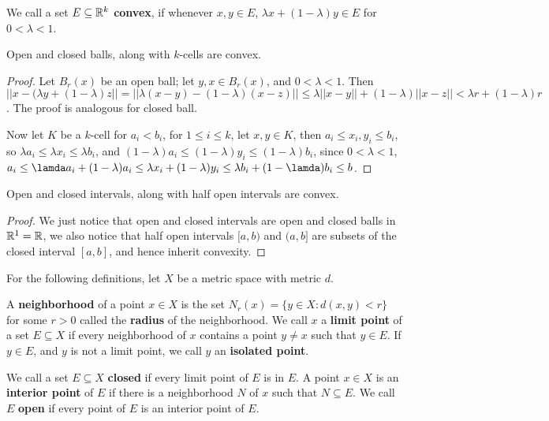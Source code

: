 \begin{definition}
    We call a set $E \subseteq \mathbb{R}^k$ \textbf{convex}, if whenever  $x,y \in E$,
    $\lambda x+(1-\lambda)y \in E$ for  $0 <\lambda<1$.
\end{definition}

\begin{lemma}\label{2.2.1}
    Open and closed balls, along with $k$-cells are convex.
\end{lemma}
\begin{proof}
    Let $B_r(x)$ be an open ball; let $y,x \in B_r(x)$, and  $0<\lambda<1$. Then
    $||x-(\lambda y+(1-\lambda)z||=||\lambda(x-y)-(1-\lambda)(x-z)|| \leq \lambda||x-y||+(1-\lambda)||x-z||<\lambda r+(1-\lambda)r$.
    The proof is analogous for  closed ball.

    Now let  $K$ be a  $k$-cell for  $a_i<b_i$, for  $1 \leq i \leq k$, let  $x,y \in K$,
    then $a_i \leq x_i,y_i \leq b_i$, so  $\lambda a_i \leq \lambda x_i \leq \lambda b_i$, and $(1-\lambda)a_i \leq (1-\lambda)y_i
    \leq (1-\lambda)b_i$, since  $0<\lambda<1$, $a_i \leq \lamda a_i+(1-\lambda)a_i \leq \lambda x_i+(1-\lambda)y_i \leq \lambda
    b_i+(1-\lamda)b_i \leq b$.
\end{proof}

\begin{corollary}
    Open and closed intervals, along with half open intervals are convex.
\end{corollary}
\begin{proof}
    We just notice that open and closed intervals are open and closed balls in $\mathbb{R}^1=\mathbb{R}$,
    we also notice that half open intervals $[a,b)$ and  $(a,b]$ are subsets of the closed interval
    $[a,b]$, and hence inherit convexity.
\end{proof}

For the following definitions, let $X$ be a metric space with metric $d$.

\begin{definition}
    A  \textbf{neighborhood} of a point $x \in X$ is the set
    $N_r(x)=\{y \in X: d(x,y)<r\}$ for some $r>0$ called the \textbf{radius} of the neighborhood.
    We call  $x$ a \textbf{limit point} of a set  $E \subseteq X$ if every neighborhood of  $x$
    contains a point  $y \neq x$ such that  $y \in E$. If  $y \in E$, and $y$ is not
    a limit point, we call  $y$ an \textbf{isolated point}.
\end{definition}

\begin{definition}
    We call a set $E \subseteq X$ \textbf{closed} if every limit point of $E$ is in $E$. A point
    $x \in X$ is an \textbf{interior point} of $E$ if there is a neighborhood $N$ of  $x$ such that
    $N \subseteq E$. We call  $E$ \textbf{open} if every point of  $E$ is an interior point of $E$.
\end{definition}

